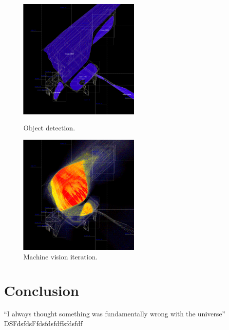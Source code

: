 \documentclass{article}
\begin{document}
\begin{figure}[H]
  \captionsetup{font=small,justification=raggedright,singlelinecheck=false}
  \parbox{6cm}{
  \includegraphics[width=6cm]{b.png}
  \caption{Object detection.}
  \label{fig:2figsA}}
  \qquad
  \begin{minipage}{6cm}
  \includegraphics[width=6cm]{a.png}
  \caption{Machine vision iteration.}
  \label{fig:2figsB}
  \end{minipage}
\end{figure}






\section{Conclusion}
``I always thought something was fundamentally wrong with the universe'' \citep{adams1995hitchhiker}\\
DSFdsfdsFfdsfdsfdffsfdsfdf


% 
\end{document}
